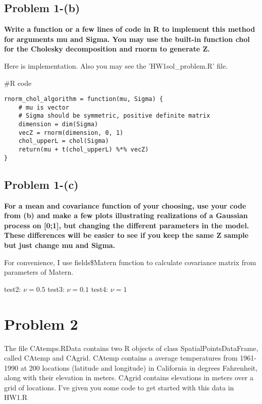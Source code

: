 \documentclass{article}
\newenvironment{Rcode}%
{%
    \begin{mdframed}
    \#R code
    \begin{small}
}
{%
    \end{small}
    \end{mdframed}
}
\begin{document}
\subsection{Problem 1-(b)}
\textbf{
Write a function or a few lines of code in R to implement this method
for arguments mu and Sigma. You may use the built-in function chol for the Cholesky decomposition and rnorm to generate Z.
}

Here is implementation. 
Also you may see the 'HW1sol\_problem.R' file.

\begin{Rcode}
    \begin{verbatim}
rnorm_chol_algorithm = function(mu, Sigma) {
    # mu is vector
    # Sigma should be symmetric, positive definite matrix
    dimension = dim(Sigma)
    vecZ = rnorm(dimension, 0, 1)
    chol_upperL = chol(Sigma)
    return(mu + t(chol_upperL) %*% vecZ)    
}
    \end{verbatim}
\end{Rcode}



\subsection{Problem 1-(c)}
\textbf{
For a mean and covariance function of your choosing, use your code from (b) and
make a few plots illustrating realizations of a Gaussian process on [0;1], but changing the different parameters in the model.
These differences will be easier to see if you keep the same Z sample but just change mu and Sigma.
}

For convenience, I use fields\$Matern function to calculate covariance matrix from parameters of Matern.

test2: $\nu = 0.5$
test3: $\nu = 0.1$
test4: $\nu = 1$






\section{Problem 2}
The file CAtemps.RData contains two R objects of class SpatialPointsDataFrame, called CAtemp and CAgrid.
CAtemp contains a average temperatures from 1961-1990 at 200 locations (latitude and longitude) in California in degrees Fahrenheit, along with their elevation in meters.
CAgrid contains elevations in meters over a grid of locations.
I've given you some code to get started with this data in HW1.R
\end{document}
